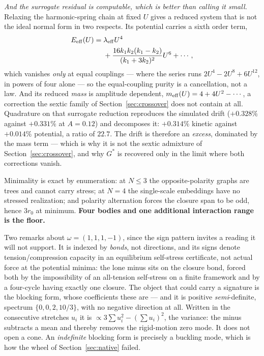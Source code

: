 \documentclass[11pt,a4paper]{article}
\newcommand{\Gstar}{{G^{*}}}
\theoremstyle{definition}
\theoremstyle{plain}
\theoremstyle{remark}
\begin{document}
\emph{And the surrogate residual is computable, which is better than calling it
small.} Relaxing the harmonic-spring chain at fixed $U$ gives a reduced system that is
not the ideal normal form in two respects. Its potential carries a sixth
order term,
\[
\begin{aligned}
E_{\rm eff}(U)={}&\lambda_{\rm eff}U^4 \\
&+\frac{16k_1k_2(k_1-k_2)}{(k_1+3k_2)^2}U^6+\cdots ,
\end{aligned}
\]
which vanishes
\emph{only} at equal couplings --- where the series runs
$2U^4 - 2U^8 + 6U^{12}$, in powers of four alone --- so the equal-coupling
purity is a cancellation, not a law. And its reduced \emph{mass} is
amplitude dependent, $m_{\rm eff}(U) = 4 + 4U^2 - \cdots$, a correction
the sextic family of Section~\ref{sec:crossover} does not contain at all.
Quadrature on that surrogate reduction reproduces the simulated drift
($+0.328\%$ against $+0.331\%$ at $A=0.12$) and decomposes it:
$+0.314\%$ kinetic against $+0.014\%$ potential, a ratio of $22.7$. The
drift is therefore an \emph{excess}, dominated by the mass term --- which
is why it is not the sextic admixture of Section~\ref{sec:crossover}, and
why $\Gstar$ is recovered only in the limit where both corrections
vanish.

Minimality is exact by enumeration: at $N\le3$ the opposite-polarity
graphs are trees and cannot carry stress; at $N=4$ the single-scale
embeddings have no stressed realization; and polarity alternation forces
the closure span to be odd, hence $3r_0$ at minimum. \textbf{Four bodies
and one additional interaction range is the floor.}

Two remarks about $\omega = (1,1,1,-1)$, since the sign pattern invites a
reading it will not support. It is indexed by \emph{bonds}, not
directions, and its signs denote tension/compression capacity in an
equilibrium self-stress certificate, not actual force at the potential
minima: the lone minus
sits on the closure bond, forced both by the impossibility of an
all-tension self-stress on a finite framework and by a four-cycle having
exactly one closure. The object that could carry a signature is the
blocking form, whose coefficients these are --- and it is positive
\emph{semi}-definite, spectrum $\{0,0,2,10/3\}$, with no negative
direction at all. Written in the consecutive stretches $u_i$ it is
$\propto 3\sum u_i^2 - (\sum u_i)^2$, the variance: the minus subtracts a
mean and thereby removes the rigid-motion zero mode. It does not open a
cone. An \emph{indefinite} blocking form is precisely a buckling mode,
which is how the wheel of Section~\ref{sec:native} failed.
\end{document}
